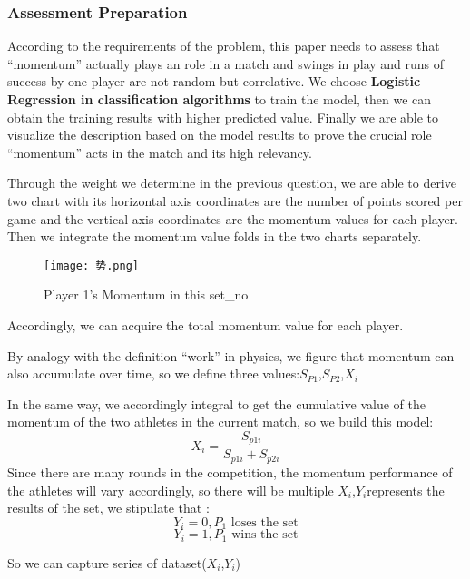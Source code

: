\documentclass{mcmthesis}
\begin{document}
\subsubsection{Assessment Preparation}
According to the requirements of the problem, this paper needs to assess that “momentum”
actually plays an role in a match and swings in play and runs of success by one player are not
random but correlative. We choose {\bf Logistic Regression in classification algorithms} to train the
model, then we can obtain the training results with higher predicted value. Finally we are able to
visualize the description based on the model results to prove the crucial role “momentum” acts in
the match and its high relevancy.

Through the weight we determine in the previous question, we are able to derive two chart
with its horizontal axis coordinates are the number of points scored per game and the vertical axis
coordinates are the momentum values for each player. Then we integrate the momentum value
folds in the two charts separately.
\begin{figure}[H]
    \centering
    \texttt{[image: 势.png]}
    \caption{Player 1's Momentum in this set\_no} \label{Figure 12}
\end{figure}
Accordingly, we can acquire the total momentum value for each player. 

By analogy with the definition “work” in physics, we figure that momentum can also
accumulate over time, so we define three values:$S_{P1}$,$S_{P2}$,$X_{i}$

In the same way, we accordingly integral to get the cumulative value of the momentum of the
two athletes in the current match, so we build this model:
\begin{equation} \label{3}
    X_{i}=\frac{S_{p1i}}{S_{p1i}+S_{p2i}}  
\end{equation}
Since there are many rounds in the competition, the momentum performance of the athletes
will vary accordingly, so there will be multiple $X_{i}$,$Y_{i}$represents the results of the set, we stipulate
that :
\begin{equation} \label{4}
    Y_{i} = 0, P_{1} \text{ loses the set}
\end{equation}
\begin{equation} \label{5}
    Y_{i} = 1, P_{1} \text{ wins the set}
\end{equation}

So we can capture series of dataset($X_{i}$,$Y_{i}$)
\end{document}
